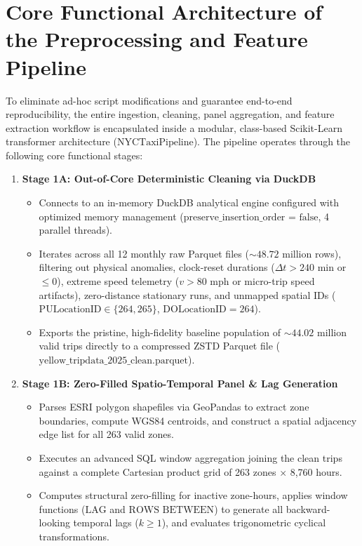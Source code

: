 \documentclass[11pt,a4paper]{article}
\begin{document}
\section{Core Functional Architecture of the Preprocessing and Feature Pipeline}
To eliminate ad-hoc script modifications and guarantee end-to-end reproducibility, the entire ingestion, cleaning, panel aggregation, and feature extraction workflow is encapsulated inside a modular, class-based Scikit-Learn transformer architecture ($\text{NYCTaxiPipeline}$). The pipeline operates through the following core functional stages:

\begin{enumerate}
    \item \textbf{Stage 1A: Out-of-Core Deterministic Cleaning via DuckDB}
    \begin{itemize}
        \item Connects to an in-memory DuckDB analytical engine configured with optimized memory management ($\text{preserve\_insertion\_order = false}$, 4 parallel threads).
        \item Iterates across all 12 monthly raw Parquet files ($\sim 48.72$ million rows), filtering out physical anomalies, clock-reset durations ($\Delta t > 240$ min or $\le 0$), extreme speed telemetry ($v > 80$ mph or micro-trip speed artifacts), zero-distance stationary runs, and unmapped spatial IDs ($\text{PULocationID} \in \{264, 265\}$, $\text{DOLocationID} = 264$).
        \item Exports the pristine, high-fidelity baseline population of $\sim 44.02$ million valid trips directly to a compressed ZSTD Parquet file ($\text{yellow\_tripdata\_2025\_clean.parquet}$).
    \end{itemize}
    
    \item \textbf{Stage 1B: Zero-Filled Spatio-Temporal Panel \& Lag Generation}
    \begin{itemize}
        \item Parses ESRI polygon shapefiles via GeoPandas to extract zone boundaries, compute WGS84 centroids, and construct a spatial adjacency edge list for all 263 valid zones.
        \item Executes an advanced SQL window aggregation joining the clean trips against a complete Cartesian product grid of 263 zones $\times$ 8,760 hours.
        \item Computes structural zero-filling for inactive zone-hours, applies window functions ($\text{LAG}$ and $\text{ROWS BETWEEN}$) to generate all backward-looking temporal lags ($k \ge 1$), and evaluates trigonometric cyclical transformations.
    \end{itemize}
    

\end{enumerate}
\end{document}
